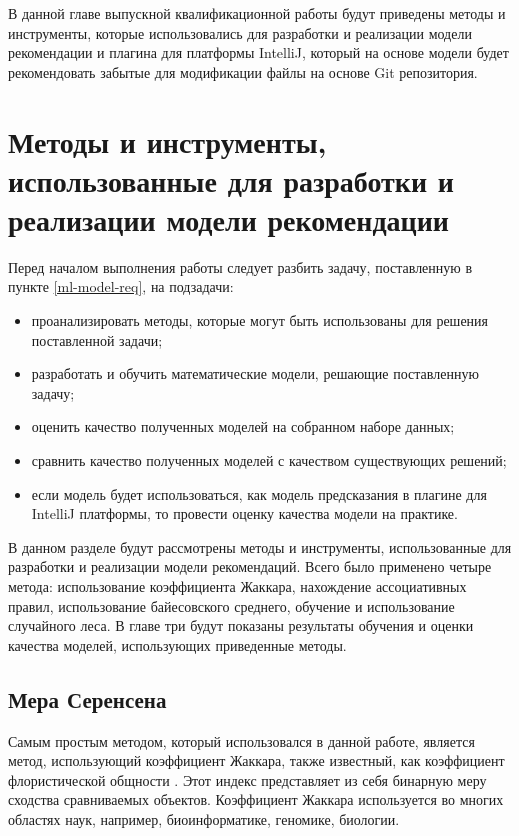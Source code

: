В данной главе выпускной квалификационной работы будут приведены методы и инструменты, которые использовались для разработки и реализации модели рекомендации и плагина для платформы IntelliJ, который на основе модели будет рекомендовать забытые для модификации файлы на основе Git репозитория.

\section{Методы и инструменты, использованные для разработки и реализации модели рекомендации}\label{chapter2-models}
Перед началом выполнения работы следует разбить задачу, поставленную в пункте \ref{ml-model-req}, на подзадачи:
    \begin{itemize}
        \item проанализировать методы, которые могут быть использованы для решения поставленной задачи;
        \item разработать и обучить математические модели, решающие поставленную задачу;
        \item оценить качество полученных моделей на собранном наборе данных;
        \item сравнить качество полученных моделей с качеством существующих решений;
        \item если модель будет использоваться, как модель предсказания в плагине для IntelliJ платформы, то провести оценку качества модели на практике.
    \end{itemize}

В данном разделе будут рассмотрены методы и инструменты, использованные для разработки и реализации модели рекомендаций. Всего было применено четыре метода: использование коэффициента Жаккара, нахождение ассоциативных правил, использование байесовского среднего, обучение и использование случайного леса. В главе три будут показаны результаты обучения и оценки качества моделей, использующих приведенные методы.
    \subsection{Мера Серенсена}\label{chapter-2-coef}
Самым простым методом, который использовался в данной работе, является метод, использующий коэффициент Жаккара, также известный, как коэффициент флористической общности \cite{jacard}. Этот индекс представляет из себя бинарную меру сходства сравниваемых объектов. Коэффициент Жаккара используется во многих областях наук, например, биоинформатике, геномике, биологии. 

